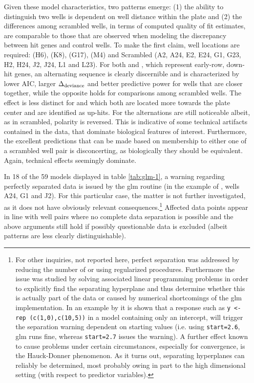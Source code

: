 Given these model characteristics, two patterns emerge: (1) the ability to distinguish two wells is dependent on well distance within the plate and (2) the differences among scrambled wells, in terms of computed quality of fit estimates, are comparable to those that are observed when modeling the discrepancy between hit genes and control wells. To make the first claim, well locations are required:  (H6),  (K8),  (G17),  (M4) and Scrambled (A2, A24, E2, E24, G1, G23, H2, H24, J2, J24, L1 and L23). For both  and , which represent early-row, down-hit genes, an alternating sequence is clearly discernible and is characterized by lower AIC, larger $\Delta\textsubscript{deviance}$ and better predictive power for wells that are closer together, while the opposite holds for comparisons among scrambled wells. The effect is less distinct for  and  which both are located more towards the plate center and are identified as up-hits. For  the alternations are still noticeable albeit, as in scrambled, polarity is reversed. This is indicative of some technical artifacts contained in the data, that dominate biological features of interest. Furthermore, the excellent predictions that can be made based on membership to either one of a scrambled well pair is disconcerting, as biologically they should be equivalent. Again, technical effects seemingly dominate.

In 18 of the 59 models displayed in table \ref{tab:glm-1}, a warning regarding perfectly separated data is issued by the glm routine (in the example of , wells A24, G1 and J2). For this particular case, the matter is not further investigated, as it does not have obviously relevant consequences.\footnote{For other inquiries, not reported here, perfect separation was addressed by reducing the number of  or using regularized procedures. Furthermore the issue was studied by solving associated linear programming problems in order to explicitly find the separating hyperplane and thus determine whether this is actually part of the data or caused by numerical shortcomings of the glm implementation. In an example by \citeauthor{Gelman2007} it is shown that a response such as \texttt{y <- rep (c(1,0),c(10,5))} in a model containing only an intercept, will trigger the separation warning dependent on starting values (i.e. using \texttt{start=2.6}, glm runs fine, whereas \texttt{start=2.7} issues the warning). A further effect known to cause problems under certain circumstances, especially for convergence, is the Hauck-Donner phenomenon. As it turns out, separating hyperplanes can reliably be determined, most probably owing in part to the high dimensional setting (with respect to predictor variables).} Affected data points appear in line with well pairs where no complete data separation is possible and the above arguments still hold if possibly questionable data is excluded (albeit patterns are less clearly distinguishable).

